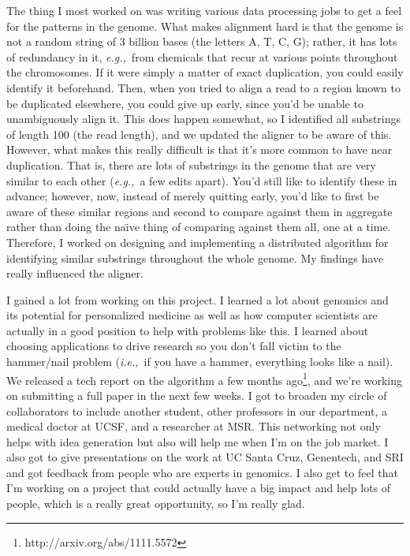 \documentclass{article}
\newcommand{\ie}{{\em i.e.,}~}
\newcommand{\eg}{{\em e.g.,}~}
\begin{document}
The thing I most worked on was writing various data processing jobs to get a feel for the patterns in the genome.
What makes alignment hard is that the genome is not a random string of 3 billion bases (the letters A, T, C, G); rather, it has lots of redundancy in it, \eg from chemicals that recur at various points throughout the chromosomes. %
If it were simply a matter of exact duplication, you could easily identify it beforehand.
Then, when you tried to align a read to a region known to be duplicated elsewhere, you could give up early, since you'd be unable to unambiguously align it.
This does happen somewhat, so I identified all substrings of length 100 (the read length), and we updated the aligner to be aware of this.
However, what makes this really difficult is that it's more common to have near duplication.
That is, there are lots of substrings in the genome that are very similar to each other (\eg a few edits apart).
You'd still like to identify these in advance; however, now, instead of merely quitting early, you'd like to first be aware of these similar regions and second to compare against them in aggregate rather than doing the na\"{\i}ve thing of comparing against them all, one at a time.
Therefore, I worked on designing and implementing a distributed algorithm for identifying similar substrings throughout the whole genome.
My findings have really influenced the aligner.

I gained a lot from working on this project.
I learned a lot about genomics and its potential for personalized medicine as well as how computer scientists are actually in a good position to help with problems like this.
I learned about choosing applications to drive research so you don't fall victim to the hammer/nail problem (\ie if you have a hammer, everything looks like a nail).
We released a tech report on the algorithm a few months ago\footnote{http://arxiv.org/abs/1111.5572}, and we're working on submitting a full paper in the next few weeks.
I got to broaden my circle of collaborators to include another student, other professors in our department, a medical doctor at UCSF, and a researcher at MSR.
This networking not only helps with idea generation but also will help me when I'm on the job market.
I also got to give presentations on the work at UC Santa Cruz, Genentech, and SRI and got feedback from people who are experts in genomics.
I also get to feel that I'm working on a project that could actually have a big impact and help lots of people, which is a really great opportunity, so I'm really glad.
\end{document}
